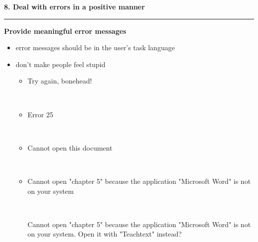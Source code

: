 \documentclass[pdf]{beamer}
\begin{document}
\begin{frame}
{\textbf{8. Deal with errors in a positive manner}}{\textcolor{red}{\rule{12cm}{1.2pt}}}

\textbf{Provide meaningful error messages}
\begin{itemize}
		\item[--] error messages should be in the user's task language
		\item[--] don't make people feel stupid
           \begin{itemize}
	         \item[$\break$]Try again, bonehead!
	        
	        \
	        
	        \item[$\break$]Error 25
	        
	        \
	        
	        \item[$\break$]Cannot open this document
	        
	        \
	        
	        \item[$\break$]Cannot open "chapter 5" because the application "Microsoft Word" is not on your system
	        
	        \
	        
	        Cannot open "chapter 5" because the application "Microsoft Word" is not on your system. Open it with "Teachtext" instead?

	    \end{itemize} 
        \end{itemize}
\end{frame}
\end{document}
